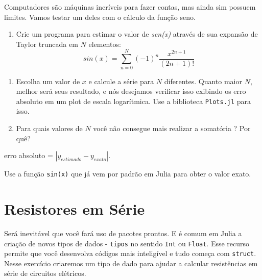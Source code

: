 \documentclass[
  letterpaper,
  DIV=11,
  numbers=noendperiod]{scrreprt}
\providecommand{\tightlist}{%
  \setlength{\itemsep}{0pt}\setlength{\parskip}{0pt}}\usepackage{longtable,booktabs,array}
\begin{document}
Computadores são máquinas incríveis para fazer contas, mas ainda sim
possuem limites. Vamos testar um deles com o cálculo da função seno.

\begin{enumerate}
\def\labelenumi{\arabic{enumi}.}
\setcounter{enumi}{3}
\tightlist
\item
  Crie um programa para estimar o valor de \emph{sen(x)} através de sua
  expansão de Taylor truncada em \(N\) elementos: \[
      sin(x) = \sum_{n=0}^{N} (-1)^n \frac{x^{2n+1}}{(2n+1)!}
   \]
\end{enumerate}

\begin{enumerate}
\def\labelenumi{\alph{enumi}.}
\item
  Escolha um valor de \(x\) e calcule a série para \(N\) diferentes.
  Quanto maior \(N\), melhor será seus resultado, e nós desejamos
  verificar isso exibindo os erro absoluto em um plot de escala
  logarítmica. Use a biblioteca \texttt{Plots.jl} para isso.
\item
  Para quais valores de \(N\) você não consegue mais realizar a
  somatória ? Por quê?
\end{enumerate}

\begin{tcolorbox}[enhanced jigsaw, rightrule=.15mm, title=\textcolor{quarto-callout-note-color}{\faInfo}\hspace{0.5em}{Nota}, colframe=quarto-callout-note-color-frame, leftrule=.75mm, bottomtitle=1mm, opacitybacktitle=0.6, coltitle=black, arc=.35mm, toptitle=1mm, opacityback=0, bottomrule=.15mm, toprule=.15mm, titlerule=0mm, breakable, colbacktitle=quarto-callout-note-color!10!white, left=2mm, colback=white]
erro absoluto = \(|y_{estimado} - y_{exato}|\).

Use a função \texttt{sin(x)} que já vem por padrão em Julia para obter o
valor exato.
\end{tcolorbox}

\hypertarget{resistores-em-suxe9rie}{%
\section{Resistores em Série}\label{resistores-em-suxe9rie}}

Será inevitável que você fará uso de pacotes prontos. E é comum em Julia
a criação de novos tipos de dados - \texttt{tipos} no sentido
\texttt{Int} ou \texttt{Float}. Esse recurso permite que você desenvolva
códigos mais inteligível e tudo começa com \texttt{struct}. Nesse
exercício criaremos um tipo de dado para ajudar a calcular resistências
em série de circuitos elétricos.
\end{document}

